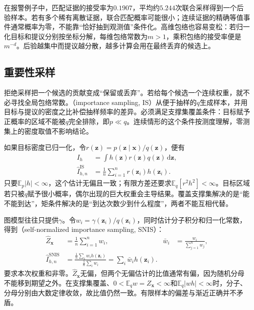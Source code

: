 在报警例子中，匹配证据的接受率为$0.1907$，平均约$5.244$次联合采样得到一个后验样本。若有多个稀有离散证据，联合匹配概率可能很小；连续证据的精确等值事件通常概率为零，不能靠“恰好抽到观测值”条件化。高维包络也容易变松：若归一化目标和提议分别按坐标分解，每维包络常数为$m>1$，乘积包络的接受率便是$m^{-d}$。后验越集中而提议越分散，越多计算会用在最终丢弃的候选上。

\subsection{重要性采样}
\label{sec:pgm-sampling-importance}

拒绝采样把一个候选的贡献变成“保留或丢弃”。若给每个候选一个连续权重，就不必寻找全局包络常数。（importance sampling, IS）从便于抽样的$q$生成样本，并用目标与提议的密度之比补偿抽样频率的差异。必须满足支撑集覆盖条件：目标赋予正概率的区域不能被$q$完全排除，即$p\ll q$。连续情形的这个条件按测度理解，零测集上的密度取值不影响结论。

如果目标密度已归一化，令$r(\bm{z})=p(\bm{z}\mid\bm{x})/q(\bm{z})$，便有
\begin{equation}
  \begin{aligned}
    I_h&=\int h(\bm{z})r(\bm{z})q(\bm{z})\,\mathrm{d}\bm{z},\\
    \widehat I_{h,n}^{\mathrm{IS}}
      &=\frac{1}{n}\sum_{i=1}^{n}r(\bm{z}_i)h(\bm{z}_i).
  \end{aligned}
  \label{eq:pgm-sampling-is}
\end{equation}
只要$\mathbb{E}_p|h|<\infty$，这个估计无偏且一致；有限方差还要求$\mathbb{E}_q[r^2h^2]<\infty$。目标区域若只被$q$赋予很小概率，偶尔出现的巨大权重会主导结果。覆盖支撑集解决的是“能不能到达”，矩条件解决的是“到达次数少到什么程度”，两者不能互相代替。

图模型往往只提供$\gamma$。令$w_i=\gamma(\bm{z}_i)/q(\bm{z}_i)$，同时估计分子积分和归一化常数，得到（self-normalized importance sampling, SNIS）：
\begin{equation}
  \begin{aligned}
    \widehat Z_{\bm{x}}&=\frac{1}{n}\sum_{i=1}^{n}w_i,&
    \bar w_i&=\frac{w_i}{\sum_{j=1}^{n}w_j},\\
    \widehat I_{h,n}^{\mathrm{SNIS}}
      &=\frac{\frac{1}{n}\sum_i w_i h(\bm{z}_i)}
              {\frac{1}{n}\sum_i w_i}
       =\sum_i\bar w_i h(\bm{z}_i).
  \end{aligned}
  \label{eq:pgm-sampling-snis}
\end{equation}
要求本次权重和非零。$\widehat Z_{\bm{x}}$无偏，但两个无偏估计的比值通常有偏，因为随机分母不能移到期望之外。在支撑集覆盖、$0<\mathbb{E}_q w=Z_{\bm{x}}<\infty$和$\mathbb{E}_q|wh|<\infty$时，分子、分母分别由大数定律收敛，故比值仍然一致。有限样本的偏差与渐近正确并不矛盾。

